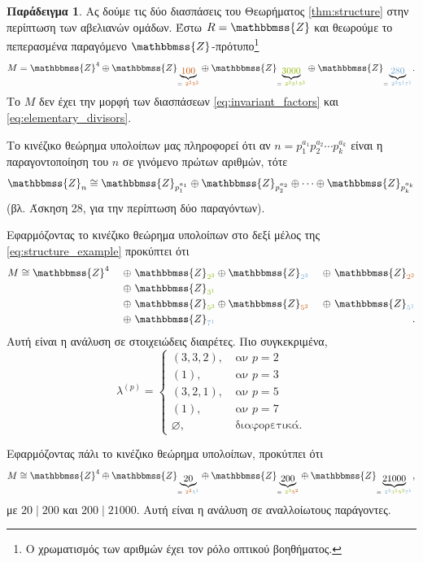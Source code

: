 \documentclass[12pt,a4paper,reqno]{amsart}
\makeatletter
\theoremstyle{definition}
\newtheorem{example}[theorem]{Παράδειγμα}
\theoremstyle{remark}
\numberwithin{theorem}{section}
\numberwithin{exercise}{section}
\numberwithin{equation}{section}
\newcommand{\ZZ}{\mathbbmss{Z}}
\renewcommand{\emptyset}{\varnothing}
\def\mathcolor#1#{\@mathcolor{#1}}
\def\@mathcolor#1#2#3{%
  \protect\leavevmode
  \begingroup
    \color#1{#2}#3%
  \endgroup
}
\makeatother
\begin{document}
\begin{example}
    \label{ex:structure}
    Ας δούμε τις δύο διασπάσεις του Θεωρήματος \ref{thm:structure} στην περίπτωση των αβελιανών ομάδων. Έστω $R = \ZZ$ και θεωρούμε το πεπερασμένα παραγόμενο $\ZZ$-πρότυπο\footnote{Ο χρωματισμός των αριθμών έχει τον ρόλο οπτικού βοηθήματος.}
    \begin{equation}
        \label{eq:structure_example}
        M = \ZZ^4 \oplus \ZZ_{\underbrace{\mathcolor{burntorange}{100}}_{= \ \mathcolor{burntorange}{2^25^2}}} \oplus \ZZ_{\underbrace{\mathcolor{applegreen}{3000}}_{= \ \mathcolor{applegreen}{2^33^15^3}}} \oplus \ZZ_{\underbrace{\mathcolor{iceberg}{280}}_{= \ \mathcolor{iceberg}{2^35^17^1}}}.
    \end{equation}
    Το $M$ δεν έχει την μορφή των διασπάσεων \eqref{eq:invariant_factors} και \eqref{eq:elementary_divisors}. 

    Το κινέζικο θεώρημα υπολοίπων μας πληροφορεί ότι αν $n = p_1^{a_1}p_2^{a_2}\cdots p_k^{a_k}$ είναι η παρα\-γοντοποίηση του $n$ σε γινόμενο πρώτων αριθμών, τότε 
    \[
    \ZZ_n \cong \ZZ_{p_1^{a_1}} \oplus \ZZ_{p_2^{a_2}} \oplus \cdots \oplus \ZZ_{p_k^{a_k}}
    \]
    (βλ. Άσκηση 28, για την περίπτωση δύο παραγόντων).

    Εφαρμόζοντας το κινέζικο θεώρημα υπολοίπων στο δεξί μέλος της \eqref{eq:structure_example} προκύπτει ότι 
    \begin{alignat*}{5}
       M &\cong \ZZ^4 \ &\oplus \ \ZZ_{\mathcolor{applegreen}{2^3}} &\oplus \ZZ_{\mathcolor{iceberg}{2^3}} \ &\oplus \ \ZZ_{\mathcolor{burntorange}{2^2}} \\
        & &\oplus \ \ZZ_{\mathcolor{applegreen}{3^1}} & & \\
        & &\oplus \ \ZZ_{\mathcolor{applegreen}{5^3}} &\oplus \ZZ_{\mathcolor{burntorange}{5^2}} \ &\oplus \ \ZZ_{\mathcolor{iceberg}{5^1}} \\
        & &\oplus \ \ZZ_{\mathcolor{iceberg}{7^1}} & &.
    \end{alignat*}
    Αυτή είναι η ανάλυση σε στοιχειώδεις διαιρέτες. Πιο συγκεκριμένα, 
    \[
    \lambda^{(p)} = 
    \begin{cases}
        (3,3,2), &\ \text{αν $p = 2$} \\
        (1), &\ \text{αν $p = 3$} \\
        (3,2,1), &\ \text{αν $p = 5$} \\
        (1), &\ \text{αν $p = 7$} \\
        \emptyset, &\ \text{διαφορετικά}.
    \end{cases}
    \]

    Εφαρμόζοντας πάλι το κινέζικο θεώρημα υπολοίπων, προκύτπει ότι 
    \[
    M \cong \ZZ^4 
    \oplus \ZZ_{\underbrace{20}_{= \ \mathcolor{burntorange}{2^2}\mathcolor{iceberg}{5^1}}} 
    \oplus \ZZ_{\underbrace{200}_{= \ \mathcolor{applegreen}{2^3}\mathcolor{burntorange}{5^2}}}
    \oplus \ZZ_{\underbrace{21000}_{= \ \mathcolor{iceberg}{2^3}\mathcolor{applegreen}{3^1}\mathcolor{applegreen}{5^3}\mathcolor{iceberg}{7^1}}},
    \]
    με $20 \mid 200$ και $200 \mid 21000$. Αυτή είναι η ανάλυση σε αναλλοίωτους παράγοντες.
\end{example}
\end{document}
